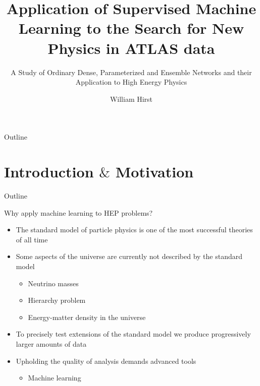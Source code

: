 \documentclass[UKenglish]{beamer}
\author{William Hirst}
\title[Supervised Learning in HEP]{Application of Supervised Machine Learning to the Search for New Physics in ATLAS data}
\subtitle{A Study of Ordinary Dense, Parameterized and Ensemble Networks and their Application to High Energy Physics}
\begin{document}
\begin{frame}{Outline}
    \tableofcontents
\end{frame}


\section{Introduction $\&$ Motivation}
\begin{frame}{Outline}
    \tableofcontents[currentsection]
\end{frame}

\begin{frame}{Why apply machine learning to HEP problems?}
    \begin{itemize}
        \item The standard model of particle physics is one of the most 
              successful theories of all time
        \item Some aspects of the universe are currently not described by the 
              standard model 
        \begin{itemize}
            \item Neutrino masses 
            \item Hierarchy problem 
            \item Energy-matter density in the universe
        \end{itemize}
        \item To precisely test extensions of the standard model we produce 
        progressively larger amounts of data
        \item Upholding the quality of analysis demands advanced tools
        \begin{itemize}
            \item Machine learning
        \end{itemize}
    \end{itemize}
\end{frame}
\end{document}
